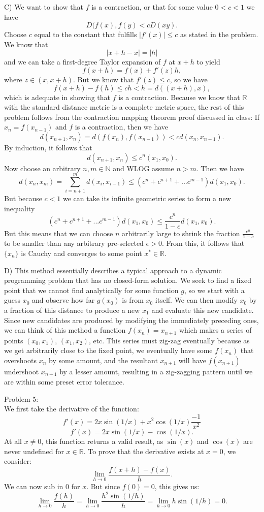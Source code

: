 \documentclass[12pt,leqno]{article}
\begin{document}
\indent C) We want to show that $f$ is a contraction, or that for some value $0<c<1$ we have 
$$D(f(x), f(y)<cD(x y).$$
Choose $c$ equal to the constant that fulfills $|f'(x)|\leq c$ as stated in the problem. We know that 
$$|x+h - x| = |h|$$
and we can take a first-degree Taylor expansion of $f$ at $x+h$ to yield
$$f(x+h) = f(x) + f'(z)h,$$
where $z \in (x, x+h)$. But we know that $f'(z) \leq c$, so we have
$$f(x+h) - f(h) \leq ch < h = d((x+h), x),$$
which is adequate in showing that $f$ is a contraction. Because we know that $\mathds{R}$ with the standard distance metric is a complete metric space, the rest of this problem follows from the contraction mapping theorem proof discussed in class: If $x_n = f(x_{n-1})$ and $f$ is a contraction, then we have
$$d(x_{n+1}, x_n)=d(f(x_n), f(x_{n-1}))<cd(x_n,x_{n-1}).$$ 
By induction, it follows that 
$$d(x_{n+1},x_n) \leq c^n (x_1,x_0).$$
Now choose an arbitrary $n, m \in \mathds{N}$ and WLOG assume $n>m$. Then we have
$$d(x_n,x_m) = \sum^m_{i = n+1} d(x_i,x_{i-1}) \leq (c^n + c^{n+1} + . . . c^{m-1})d(x_1,x_0).$$
But because $c<1$ we can take its infinite geometric series to form a new inequality
$$ (c^n + c^{n+1} + . . . c^{m-1})d(x_1,x_0) \leq \frac{c^n}{1-c}d(x_1,x_0).$$
But this means that we can choose $n$ arbitrarily large to shrink the fraction $\frac{c^n}{1-c}$ to be smaller than any arbitrary pre-selected $\epsilon>0$. From this, it follows that $\{x_n\}$ is Cauchy and converges to some point $x^* \in \mathds{R}.$

\indent D) This method essentially describes a typical approach to a dynamic programming problem that has no closed-form solution. We seek to find a fixed point that we cannot find analytically for some function $g$, so we start with a guess $x_0$ and observe how far $g(x_0)$ is from $x_0$ itself. We can then modify $x_0$ by a fraction of this distance to produce a new $x_1$ and evaluate this new candidate. Since new candidates are produced by modifying the immediately preceding ones, we can think of this method a function $f(x_n)=x_{n+1}$ which makes a series of points $(x_0, x_1)$, $(x_1, x_2)$, etc. This series must zig-zag eventually because as we get arbitrarily close to the fixed point, we eventually have some $f(x_n)$ that overshoots $x_n$ by some amount, and the resultant $x_{n+1}$ will have $f(x_{n+1})$ undershoot $x_{n+1}$ by a lesser amount, resulting in a zig-zagging pattern until we are within some preset error tolerance. 

\bigskip
\noindent Problem 5:\\
\indent We first take the derivative of the function:
$$f'(x) = 2x \sin(1/x) + x^2 \cos(1/x)\frac{-1}{x^2}$$
$$f'(x) = 2x \sin(1/x) - \cos(1/x).$$
At all $x \neq 0$, this function returns a valid result, as $\sin(x)$ and $\cos(x)$ are never undefined for $x \in \mathds{R}$. To prove that the derivative exists at $x=0$, we consider:
$$\lim_{h \rightarrow 0} \frac{f(x+h) - f(x)}{h}.$$
We can now sub in 0 for $x$. But since $f(0) = 0$, this gives us:
$$\lim_{h \rightarrow 0} \frac{f(h)}{h} = \lim_{h \rightarrow 0} \frac{h^2 \sin(1/h)}{h}=\lim_{h \rightarrow 0} h \sin(1/h) = 0.$$
\end{document}
